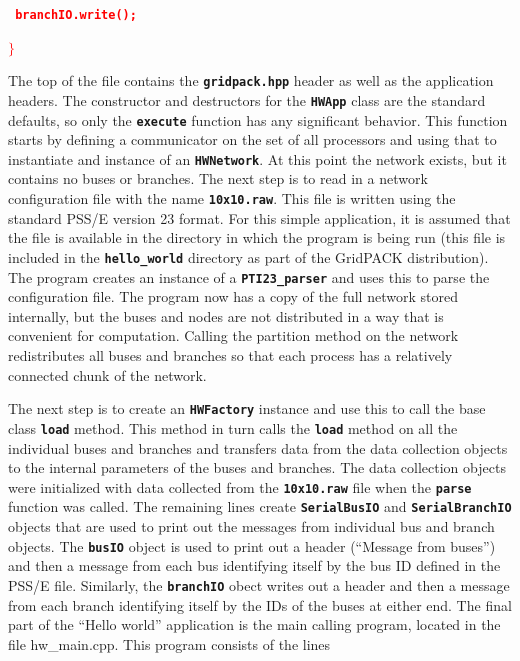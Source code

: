 \documentclass[12pt]{report} %
\begin{document}
\textcolor{red}{\texttt{\textbf{  branchIO.write();}}}

\textcolor{red}{\texttt{\textbf{$\boldsymbol{\mathrm{\}}}$}}}

The top of the file contains the \texttt{\textbf{gridpack.hpp}} header as well as the application headers. The constructor and destructors for the \texttt{\textbf{HWApp}} class are the standard defaults, so only the \texttt{\textbf{execute}} function has any significant behavior. This function starts by defining a communicator on the set of all processors and using that to instantiate and instance of an \texttt{\textbf{HWNetwork}}. At this point the network exists, but it contains no buses or branches. The next step is to read in a network configuration file with the name \texttt{\textbf{10x10.raw}}. This file is written using the standard PSS/E version 23 format. For this simple application, it is assumed that the file is available in the directory in which the program is being run (this file is included in the \texttt{\textbf{hello\_world}} directory as part of the GridPACK distribution). The program creates an instance of a \texttt{\textbf{PTI23\_parser}} and uses this to parse the configuration file. The program now has a copy of the full network stored internally, but the buses and nodes are not distributed in a way that is convenient for computation. Calling the partition method on the network redistributes all buses and branches so that each process has a relatively connected chunk of the network.

The next step is to create an \texttt{\textbf{HWFactory}} instance and use this to call the base class \texttt{\textbf{load}} method. This method in turn calls the \texttt{\textbf{load}} method on all the individual buses and branches and transfers data from the data collection objects to the internal parameters of the buses and branches. The data collection objects were initialized with data collected from the \texttt{\textbf{10x10.raw}} file when the \texttt{\textbf{parse}} function was called. The remaining lines create \texttt{\textbf{SerialBusIO}} and \texttt{\textbf{SerialBranchIO}} objects that are used to print out the messages from individual bus and branch objects. The \texttt{\textbf{busIO}} object is used to print out a header (``Message from buses'') and then a message from each bus identifying itself by the bus ID defined in the PSS/E file. Similarly, the \texttt{\textbf{branchIO}} obect writes out a header and then a message from each branch identifying itself by the IDs of the buses at either end.
The final part of the ``Hello world'' application is the main calling program, located in the file hw\_main.cpp. This program consists of the lines
\end{document}
